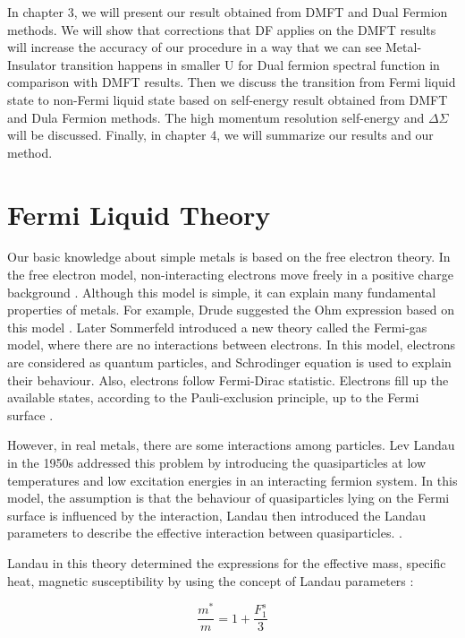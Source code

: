 In chapter 3, we will present our result obtained from DMFT and Dual Fermion methods. We will show that corrections that DF applies on the DMFT results will increase the accuracy of our procedure in a way that we can see Metal-Insulator transition happens in smaller U for Dual fermion spectral function in comparison with DMFT results. Then we discuss the transition from Fermi liquid state to non-Fermi liquid state based on self-energy result obtained from DMFT and Dula Fermion methods. The high momentum resolution self-energy and $\Delta \Sigma$ will be discussed. Finally, in chapter 4, we will summarize our results and our method. 


\section{ Fermi Liquid Theory}

Our basic knowledge about simple metals is based on the free electron theory. In the free electron model, non-interacting electrons move freely in a positive charge background \cite{Kittel}. Although this model is simple, it can explain many fundamental properties of metals. For example, Drude suggested the Ohm expression based on this model \cite{Lifshitz}. Later Sommerfeld introduced a new theory called the Fermi-gas model, where there are no interactions between electrons. In this model, electrons are considered as quantum particles, and Schrodinger equation is used to explain their behaviour. Also, electrons follow Fermi-Dirac statistic. Electrons fill up the available states, according to the Pauli-exclusion principle, up to the Fermi surface \cite{Kittel, Nozieresk}.


However, in real metals, there are some interactions among particles. Lev Landau in the 1950s addressed this problem by introducing the quasiparticles at low temperatures and low excitation energies in an interacting fermion system. In this model, the assumption is that the behaviour of quasiparticles lying on the Fermi surface is influenced by the interaction, Landau then introduced the Landau parameters to describe the effective interaction between quasiparticles. \cite{Baym, LANDAU}. 

Landau in this theory determined the expressions for the effective mass, specific heat, magnetic susceptibility by using the concept of Landau parameters \cite{LANDAU,Mark}:

\begin{equation}
    \frac{m^*}{m}=1+\frac{F_1 ^s}{3}
\end{equation}


